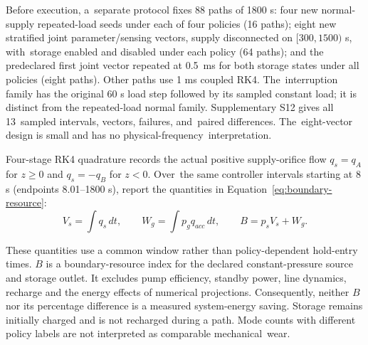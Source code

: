 \documentclass[machines,article,submit,pdftex,moreauthors]{Definitions/mdpi}
\begin{document}
Before execution, a~separate protocol fixes 88 paths of 1800 s: four new normal-supply repeated-load seeds under each of four policies (16 paths); eight new stratified joint parameter/sensing vectors, supply disconnected on $[300,1500)$ s, with~storage enabled and disabled under each policy (64 paths); and the predeclared first joint vector repeated at \mbox{0.5 ms} for both storage states under all policies (eight paths). Other paths use 1 ms coupled RK4. The~interruption family has the original 60 s load step followed by its sampled constant load; it is distinct from the repeated-load normal family. Supplementary S12 gives all \mbox{13 sampled} intervals, vectors, failures, and~paired differences. The~eight-vector design is small and has no physical-frequency~interpretation.

Four-stage RK4 quadrature records the actual positive supply-orifice flow $q_s=q_A$ for $z\ge0$ and $q_s=-q_B$ for $z<0$. Over~the same controller intervals starting at 8 s (endpoints 8.01--1800 s), report the quantities in Equation~\eqref{eq:boundary-resource}:
\begin{equation}
 V_s=\int q_s\,dt,\qquad
 W_g=\int p_gq_{acc}\,dt,\qquad
 B=p_sV_s+W_g.\label{eq:boundary-resource}
\end{equation}

These quantities use a common window rather than policy-dependent hold-entry times. $B$ is a boundary-resource index for the declared constant-pressure source and storage outlet. It excludes pump efficiency, standby power, line dynamics, recharge and the energy effects of numerical projections. Consequently, neither $B$ nor its percentage difference is a measured system-energy saving. Storage remains initially charged and is not recharged during a path. Mode counts with different policy labels are not interpreted as comparable mechanical~wear.
\end{document}
